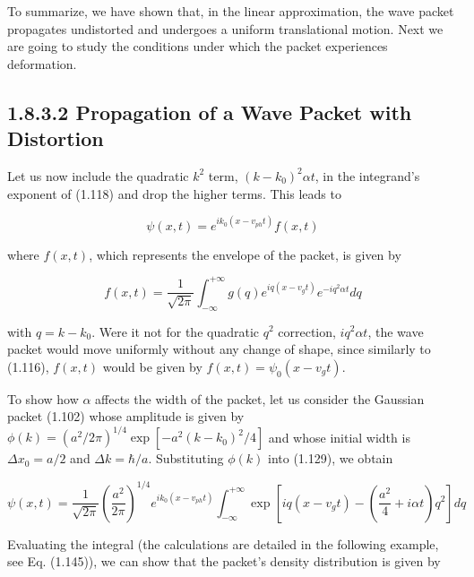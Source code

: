 \documentclass[10pt]{article}
\begin{document}
To summarize, we have shown that, in the linear approximation, the wave packet propagates undistorted and undergoes a uniform translational motion. Next we are going to study the conditions under which the packet experiences deformation.

\subsection*{1.8.3.2 Propagation of a Wave Packet with Distortion}
Let us now include the quadratic $k^{2}$ term, $\left(k-k_{0}\right)^{2} \alpha t$, in the integrand's exponent of (1.118) and drop the higher terms. This leads to


\begin{equation*}
\psi(x, t)=e^{i k_{0}\left(x-v_{p h} t\right)} f(x, t) \tag{1.129}
\end{equation*}


where $f(x, t)$, which represents the envelope of the packet, is given by


\begin{equation*}
f(x, t)=\frac{1}{\sqrt{2 \pi}} \int_{-\infty}^{+\infty} g(q) e^{i q\left(x-v_{g} t\right)} e^{-i q^{2} \alpha t} d q \tag{1.130}
\end{equation*}


with $q=k-k_{0}$. Were it not for the quadratic $q^{2}$ correction, $i q^{2} \alpha t$, the wave packet would move uniformly without any change of shape, since similarly to (1.116), $f(x, t)$ would be given by $f(x, t)=\psi_{0}\left(x-v_{g} t\right)$.

To show how $\alpha$ affects the width of the packet, let us consider the Gaussian packet (1.102) whose amplitude is given by $\phi(k)=\left(a^{2} / 2 \pi\right)^{1 / 4} \exp \left[-a^{2}\left(k-k_{0}\right)^{2} / 4\right]$ and whose initial width is $\Delta x_{0}=a / 2$ and $\Delta k=\hbar / a$. Substituting $\phi(k)$ into (1.129), we obtain


\begin{equation*}
\psi(x, t)=\frac{1}{\sqrt{2 \pi}}\left(\frac{a^{2}}{2 \pi}\right)^{1 / 4} e^{i k_{0}\left(x-v_{p h} t\right)} \int_{-\infty}^{+\infty} \exp \left[i q\left(x-v_{g} t\right)-\left(\frac{a^{2}}{4}+i \alpha t\right) q^{2}\right] d q \tag{1.131}
\end{equation*}


Evaluating the integral (the calculations are detailed in the following example, see Eq. (1.145)), we can show that the packet's density distribution is given by
\end{document}
